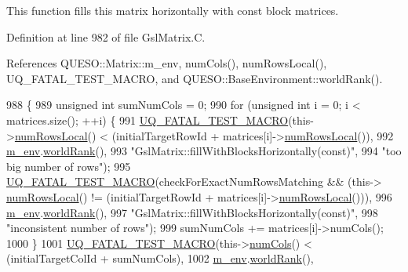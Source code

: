This function fills {\ttfamily this} matrix horizontally with const block matrices. 



Definition at line 982 of file Gsl\-Matrix.\-C.



References Q\-U\-E\-S\-O\-::\-Matrix\-::m\-\_\-env, num\-Cols(), num\-Rows\-Local(), U\-Q\-\_\-\-F\-A\-T\-A\-L\-\_\-\-T\-E\-S\-T\-\_\-\-M\-A\-C\-R\-O, and Q\-U\-E\-S\-O\-::\-Base\-Environment\-::world\-Rank().


\begin{DoxyCode}
988 \{
989   \textcolor{keywordtype}{unsigned} \textcolor{keywordtype}{int} sumNumCols = 0;
990   \textcolor{keywordflow}{for} (\textcolor{keywordtype}{unsigned} \textcolor{keywordtype}{int} i = 0; i < matrices.size(); ++i) \{
991     \hyperlink{_defines_8h_a56d63d18d0a6d45757de47fcc06f574d}{UQ\_FATAL\_TEST\_MACRO}(this->\hyperlink{class_q_u_e_s_o_1_1_gsl_matrix_ab5ec937a9fd439eef1a87e12c0dbccb4}{numRowsLocal}() < (initialTargetRowId + 
      matrices[i]->\hyperlink{class_q_u_e_s_o_1_1_gsl_matrix_ab5ec937a9fd439eef1a87e12c0dbccb4}{numRowsLocal}()),
992                         \hyperlink{class_q_u_e_s_o_1_1_matrix_a247fb0fc0b87fecdee054bb4660b68e8}{m\_env}.\hyperlink{class_q_u_e_s_o_1_1_base_environment_a78b57112bbd0e6dd0e8afec00b40ffa7}{worldRank}(),
993                         \textcolor{stringliteral}{"GslMatrix::fillWithBlocksHorizontally(const)"},
994                         \textcolor{stringliteral}{"too big number of rows"});
995     \hyperlink{_defines_8h_a56d63d18d0a6d45757de47fcc06f574d}{UQ\_FATAL\_TEST\_MACRO}(checkForExactNumRowsMatching && (this->
      \hyperlink{class_q_u_e_s_o_1_1_gsl_matrix_ab5ec937a9fd439eef1a87e12c0dbccb4}{numRowsLocal}() != (initialTargetRowId + matrices[i]->\hyperlink{class_q_u_e_s_o_1_1_gsl_matrix_ab5ec937a9fd439eef1a87e12c0dbccb4}{numRowsLocal}())),
996                         \hyperlink{class_q_u_e_s_o_1_1_matrix_a247fb0fc0b87fecdee054bb4660b68e8}{m\_env}.\hyperlink{class_q_u_e_s_o_1_1_base_environment_a78b57112bbd0e6dd0e8afec00b40ffa7}{worldRank}(),
997                         \textcolor{stringliteral}{"GslMatrix::fillWithBlocksHorizontally(const)"},
998                         \textcolor{stringliteral}{"inconsistent number of rows"});
999     sumNumCols += matrices[i]->numCols();
1000   \}
1001   \hyperlink{_defines_8h_a56d63d18d0a6d45757de47fcc06f574d}{UQ\_FATAL\_TEST\_MACRO}(this->\hyperlink{class_q_u_e_s_o_1_1_gsl_matrix_ad5005f168fe030468e834776afb1859b}{numCols}() < (initialTargetColId + sumNumCols),
1002                       \hyperlink{class_q_u_e_s_o_1_1_matrix_a247fb0fc0b87fecdee054bb4660b68e8}{m\_env}.\hyperlink{class_q_u_e_s_o_1_1_base_environment_a78b57112bbd0e6dd0e8afec00b40ffa7}{worldRank}(),

\end{DoxyCode}
